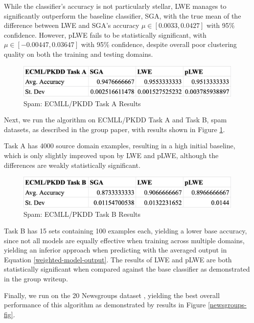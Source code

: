 \documentclass[12pt]{article}
\begin{document}
    While the classifier's accuracy is not particularly stellar, LWE manages to significantly outperform the baseline classifier, SGA, with the true mean of the difference between LWE and SGA's accuracy $\mu \in [0.0033, 0.0427]$ with 95\% confidence. However, pLWE fails to be statistically significant, with $\mu \in [-0.00447, 0.03647]$ with 95\% confidence, despite overall poor clustering quality on both the training and testing domains.


    \begin{figure}[h]
      \centering
      \includegraphics[width=.75\textwidth]{spam-task-a.png}
      \caption{Spam: ECMLL/PKDD Task A Results}
      \label{task-a-fig}
    \end{figure}

    Next, we run the algorithm on ECMLL/PKDD Task A and Task B, spam datasets, as described in the group paper, with results shown in Figure \ref{task-a-fig}.

    Task A has 4000 source domain examples, resulting in a high initial baseline, which is only slightly improved upon by LWE and pLWE, although the differences are weakly statistically significant.

    \begin{figure}[h]
      \centering
      \includegraphics[width=.75\textwidth]{spam-task-b.png}
      \caption{Spam: ECMLL/PKDD Task B Results}
      \label{task-b-fig}
    \end{figure}

    Task B has 15 sets containing 100 examples each, yielding a lower base accuracy, since not all models are equally effective when training across multiple domains, yielding an inferior approach when predicting with the averaged output in Equation \eqref{weighted-model-output}. The results of LWE and pLWE are both statistically significant when compared against the base classifier as demonstrated in the group writeup.

    Finally, we run on the 20 Newsgroups dataset \autocite{gao_fan_jiang_han_2008}, yielding the best overall performance of this algorithm as demonstrated by results in Figure \ref{newsgroups-fig}.
\end{document}

